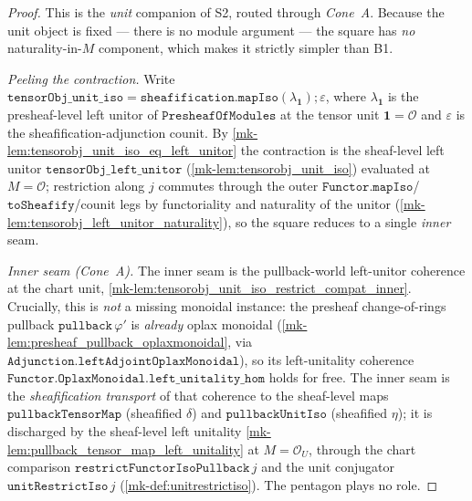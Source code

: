 \begin{proof}
  \leanok
  This is the \emph{unit} companion of S2, routed through \emph{Cone~A}. Because the unit object is
  fixed --- there is no module argument --- the square has \emph{no} naturality-in-\(M\) component,
  which makes it strictly simpler than B1.

  \emph{Peeling the contraction.} Write
  \(\mathtt{tensorObj\_unit\_iso} = \mathtt{sheafification.mapIso}(\lambda_{\mathbf 1})
  \mathbin{;} \varepsilon\), where \(\lambda_{\mathbf 1}\) is the presheaf-level left unitor of
  \(\mathtt{PresheafOfModules}\) at the tensor unit \(\mathbf 1 = \mathcal{O}\) and \(\varepsilon\) is
  the sheafification-adjunction counit. By \ref{mk-lem:tensorobj_unit_iso_eq_left_unitor} the
  contraction is the sheaf-level left unitor \(\mathtt{tensorObj\_left\_unitor}\)
  (\ref{mk-lem:tensorobj_unit_iso}) evaluated at \(M = \mathcal{O}\); restriction along \(j\) commutes
  through the outer \(\mathtt{Functor.mapIso}\)/\(\mathtt{toSheafify}\)/counit legs by functoriality
  and naturality of the unitor (\ref{mk-lem:tensorobj_left_unitor_naturality}), so the square reduces to
  a single \emph{inner} seam.

  \emph{Inner seam (Cone~A).} The inner seam is the pullback-world left-unitor coherence at the chart
  unit, \ref{mk-lem:tensorobj_unit_iso_restrict_compat_inner}. Crucially, this is \emph{not} a missing
  monoidal instance: the presheaf change-of-rings pullback \(\mathtt{pullback}\,\varphi'\) is
  \emph{already} oplax monoidal (\ref{mk-lem:presheaf_pullback_oplaxmonoidal}, via
  \(\mathtt{Adjunction.leftAdjointOplaxMonoidal}\)), so its left-unitality coherence
  \(\mathtt{Functor.OplaxMonoidal.left\_unitality\_hom}\) holds for free. The inner seam is the
  \emph{sheafification transport} of that coherence to the sheaf-level maps
  \(\mathtt{pullbackTensorMap}\) (sheafified \(\delta\)) and \(\mathtt{pullbackUnitIso}\) (sheafified
  \(\eta\)); it is discharged by the sheaf-level left unitality
  \ref{mk-lem:pullback_tensor_map_left_unitality} at \(M = \mathcal{O}_U\), through the chart comparison
  \(\mathtt{restrictFunctorIsoPullback}\,j\) and the unit conjugator \(\mathtt{unitRestrictIso}\,j\)
  (\ref{mk-def:unitrestrictiso}). The pentagon plays no role.


\end{proof}
